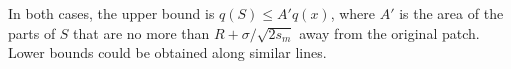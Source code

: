 \documentclass{article}
\newcommand{\citet}[1]{\cite{#1}}
\begin{document}
In both cases,
the upper bound is $q(S) \le A' q(x)$,
where $A'$ is the area of the parts of $S$ that are no more than $R+\sigma/\sqrt{2s_m}$ away from the original patch.
Lower bounds could be obtained along similar lines.


% 
\end{document}
